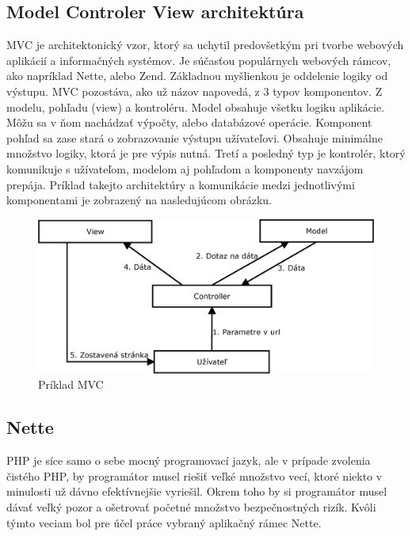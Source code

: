 \subsection{Model Controler View architektúra}
\label{sec:mvc}
MVC je architektonický vzor, ktorý sa uchytil predovšetkým pri tvorbe webových aplikácií a informačných systémov. Je súčasťou populárnych webových rámcov, ako napríklad Nette, alebo Zend. Základnou myšlienkou je oddelenie logiky od výstupu. MVC pozostáva, ako už názov napovedá, z 3 typov komponentov. Z modelu, pohľadu (view) a kontroléru. Model obsahuje všetku logiku aplikácie. Môžu sa v ňom nachádzať výpočty, alebo databázové operácie. Komponent pohľad sa zase stará o zobrazovanie výstupu užívateľovi. Obsahuje minimálne množstvo logiky, ktorá je pre výpis nutná. Tretí a posledný typ je kontrolér, ktorý komunikuje s užívateľom, modelom aj pohľadom a komponenty navzájom prepája. Príklad takejto architektúry a komunikácie medzi jednotlivými komponentami je zobrazený na nasledujúcom obrázku. \cite{Capka2013}
\begin{figure}[h]
  \centering
  \includegraphics[scale=0.40]{fig/mvc.eps}
  \caption{Príklad MVC}
  \label{fig:mvc}
\end{figure}

\subsection{Nette}
\label{sec:nette}
PHP je síce samo o sebe mocný programovací jazyk, ale v prípade zvolenia čistého PHP, by programátor musel riešiť veľké množstvo vecí, ktoré niekto v minulosti už dávno efektívnejšie vyriešil. Okrem toho by si programátor musel dávať veľký pozor a ošetrovať početné množstvo bezpečnostných rizík. Kvôli týmto veciam bol pre účel práce vybraný aplikačný rámec Nette.


